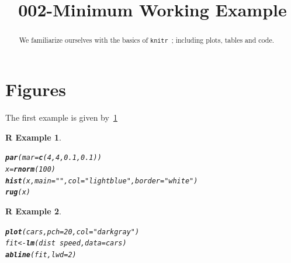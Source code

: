 \documentclass[11pt,letter]{article}\usepackage[]{graphicx}\usepackage[]{color}
\makeatletter
\newcommand{\hlnum}[1]{\textcolor[rgb]{0.686,0.059,0.569}{#1}}%
\newcommand{\hlstr}[1]{\textcolor[rgb]{0.192,0.494,0.8}{#1}}%
\newcommand{\hlopt}[1]{\textcolor[rgb]{0,0,0}{#1}}%
\newcommand{\hlstd}[1]{\textcolor[rgb]{0.345,0.345,0.345}{#1}}%
\newcommand{\hlkwb}[1]{\textcolor[rgb]{0.69,0.353,0.396}{#1}}%
\newcommand{\hlkwc}[1]{\textcolor[rgb]{0.333,0.667,0.333}{#1}}%
\newcommand{\hlkwd}[1]{\textcolor[rgb]{0.737,0.353,0.396}{\textbf{#1}}}%
\newenvironment{kframe}{%
 \def\at@end@of@kframe{}%
 \ifinner\ifhmode%
  \def\at@end@of@kframe{\end{minipage}}%
  \begin{minipage}{\columnwidth}%
 \fi\fi%
 \def\FrameCommand##1{\hskip\@totalleftmargin \hskip-\fboxsep
 \colorbox{shadecolor}{##1}\hskip-\fboxsep
     \hskip-\linewidth \hskip-\@totalleftmargin \hskip\columnwidth}%
 \MakeFramed {\advance\hsize-\width
   \@totalleftmargin\z@ \linewidth\hsize
   \@setminipage}}%
 {\par\unskip\endMakeFramed%
 \at@end@of@kframe}
\newenvironment{knitrout}{}{} %
\newtheorem{rexample}{R Example}[section]
\makeatother
\begin{document}
\pagestyle{fancy}

\title{002-Minimum Working Example}
\author{}
\maketitle






\begin{abstract}
We familiarize ourselves with the basics of \texttt{knitr}~\citep{k1,k2,k3}; including plots, tables and code. 
\end{abstract}

\section{Figures}

The first example is given by~\ref{fig1}

\begin{knitrout}
\color{fgcolor}\begin{kframe}
\begin{rexample}\label{fig1}\hfill{}\begin{alltt}
\hlkwd{par}\hlstd{(}\hlkwc{mar} \hlstd{=} \hlkwd{c}\hlstd{(}\hlnum{4}\hlstd{,} \hlnum{4}\hlstd{,} \hlnum{0.1}\hlstd{,} \hlnum{0.1}\hlstd{))}
\hlstd{x} \hlkwb{=} \hlkwd{rnorm}\hlstd{(}\hlnum{100}\hlstd{)}
\hlkwd{hist}\hlstd{(x,} \hlkwc{main} \hlstd{=} \hlstr{""}\hlstd{,} \hlkwc{col} \hlstd{=} \hlstr{"lightblue"}\hlstd{,} \hlkwc{border} \hlstd{=} \hlstr{"white"}\hlstd{)}
\hlkwd{rug}\hlstd{(x)}
\end{alltt}
\end{rexample}\end{kframe}
\end{knitrout}


\begin{knitrout}
\color{fgcolor}\begin{kframe}
\begin{rexample}\label{fig2}\hfill{}\begin{alltt}
\hlkwd{plot}\hlstd{(cars,} \hlkwc{pch} \hlstd{=} \hlnum{20}\hlstd{,} \hlkwc{col} \hlstd{=} \hlstr{"darkgray"}\hlstd{)}
\hlstd{fit} \hlkwb{<-} \hlkwd{lm}\hlstd{(dist} \hlopt{~} \hlstd{speed,} \hlkwc{data} \hlstd{= cars)}
\hlkwd{abline}\hlstd{(fit,} \hlkwc{lwd} \hlstd{=} \hlnum{2}\hlstd{)}
\end{alltt}
\end{rexample}\end{kframe}
\end{knitrout}
\end{document}
